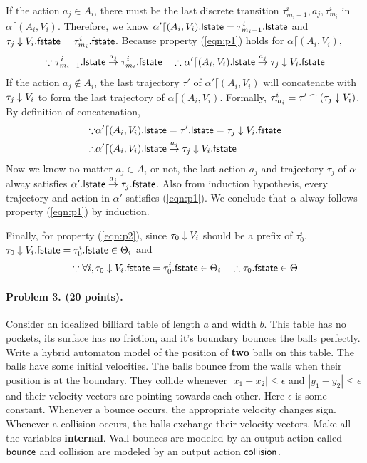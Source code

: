 \documentclass[11pt]{article}
\begin{document}
If the action $a_j \in A_i$, there must be the last discrete transition $\tau_{m_i-1}^i, a_j, \tau_{m_i}^i$ in $\alpha \lceil (A_i, V_i)$.
Therefore, we know $\alpha'\lceil (A_i, V_i).{\sf lstate} = \tau_{m_i-1}^i.{\sf lstate}$ and $\tau_{j} \mathrel{\downarrow} V_i.{\sf fstate} = \tau_{m_i}^i.{\sf fstate}$.
Because property (\ref{eqn:p1}) holds for $\alpha \lceil (A_i, V_i)$,
\begin{equation*}
\because \tau_{m_i-1}^i.{\sf lstate} \mathrel{\stackrel{a_{j}}{\rightarrow}} \tau_{m_i}^i.{\sf fstate} \quad
\therefore \alpha'\lceil (A_i, V_i).{\sf lstate} \mathrel{\stackrel{a_{j}}{\rightarrow}} \tau_{j} \mathrel{\downarrow} V_i.{\sf fstate} \\
\end{equation*}
If the action $a_{j} \notin A_i$,
the last trajectory $\tau'$ of $\alpha'\lceil (A_i, V_i)$ will concatenate with $\tau_j \mathrel{\downarrow} V_i$ to form
the last trajectory of $\alpha\lceil (A_i, V_i)$.
Formally, $\tau_{m_i}^i = \tau'\mathbin{^{\frown}} (\tau_j\mathrel{\downarrow} V_i)$.
By definition of concatenation,
\begin{align*}
    \because &\alpha'\lceil (A_i, V_i).{\sf lstate} = \tau'.{\sf lstate} = \tau_j\mathrel{\downarrow} V_i.{\sf fstate} \nonumber \\
    \therefore& \alpha'\lceil (A_i, V_i).{\sf lstate} \mathrel{\stackrel{a_{j}}{\rightarrow}} \tau_j \mathrel{\downarrow} V_i.{\sf fstate}
\end{align*}
Now we know no matter $a_{j} \in A_i$ or not,
the last action $a_j$ and trajectory $\tau_j$ of $\alpha$ alway satisfies $\alpha'.{\sf lstate} \mathrel{\stackrel{a_{j}}{\rightarrow}} \tau_{j}.{\sf fstate}$.
Also from induction hypothesis, every trajectory and action in $\alpha'$ satisfies (\ref{eqn:p1}).
We conclude that $\alpha$ alway follows property (\ref{eqn:p1}) by induction.

Finally, for property (\ref{eqn:p2}), since $\tau_0 \mathrel{\downarrow} V_i$ should be a prefix of $\tau_0^i$,
$\tau_0\mathrel{\downarrow} V_i.{\sf fstate} = \tau_0^i.{\sf fstate} \in \Theta_i$ and
\[
  \because \forall i, \tau_0\mathrel{\downarrow} V_i.{\sf fstate} = \tau_0^i.{\sf fstate} \in \Theta_i \quad \therefore \tau_0.{\sf fstate} \in \Theta
\]

\newpage

\paragraph{Problem 3. (20 points).}
Consider an idealized billiard table of length $a$ and width $b$. This table has no pockets, its surface has no friction, and it's boundary bounces the balls perfectly. Write a hybrid automaton model of the position of {\bf two\/} balls on this table. The balls have some initial velocities. The balls bounce from the walls when their position is at the boundary. They collide whenever $|x_1 - x_2| \leq \epsilon$ and $|y_1 - y_2| \leq \epsilon$ and their velocity vectors are pointing towards each other. Here  $\epsilon$ is some constant. 
Whenever a bounce occurs, the appropriate velocity changes sign.
Whenever a collision occurs, the balls exchange their velocity vectors. Make all the variables {\bf internal\/}. Wall bounces are modeled by an output action called ${\operatorname{\mathsf{bounce}}}$ and collision are modeled by an output action ${\operatorname{\mathsf{collision}}}$.
\end{document}
